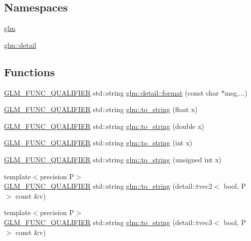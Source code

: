 \subsection*{Namespaces}
\begin{DoxyCompactItemize}
\item 
 \hyperlink{namespaceglm}{glm}
\item 
 \hyperlink{namespaceglm_1_1detail}{glm\+::detail}
\end{DoxyCompactItemize}
\subsection*{Functions}
\begin{DoxyCompactItemize}
\item 
\hyperlink{setup_8hpp_a33fdea6f91c5f834105f7415e2a64407}{G\+L\+M\+\_\+\+F\+U\+N\+C\+\_\+\+Q\+U\+A\+L\+I\+F\+I\+ER} std\+::string \hyperlink{namespaceglm_1_1detail_acd5305bbd1c5417b1eb770faf8229d14}{glm\+::detail\+::format} (const char $\ast$msg,...)
\item 
\hyperlink{setup_8hpp_a33fdea6f91c5f834105f7415e2a64407}{G\+L\+M\+\_\+\+F\+U\+N\+C\+\_\+\+Q\+U\+A\+L\+I\+F\+I\+ER} std\+::string \hyperlink{namespaceglm_a7ce206c00733fcd6f17f2923de5009ae}{glm\+::to\+\_\+string} (float x)
\item 
\hyperlink{setup_8hpp_a33fdea6f91c5f834105f7415e2a64407}{G\+L\+M\+\_\+\+F\+U\+N\+C\+\_\+\+Q\+U\+A\+L\+I\+F\+I\+ER} std\+::string \hyperlink{namespaceglm_adda934ba3c94a727a59b850fbc7431d3}{glm\+::to\+\_\+string} (double x)
\item 
\hyperlink{setup_8hpp_a33fdea6f91c5f834105f7415e2a64407}{G\+L\+M\+\_\+\+F\+U\+N\+C\+\_\+\+Q\+U\+A\+L\+I\+F\+I\+ER} std\+::string \hyperlink{namespaceglm_aaa0a03765f0abafa90fa4f605ce016b9}{glm\+::to\+\_\+string} (int x)
\item 
\hyperlink{setup_8hpp_a33fdea6f91c5f834105f7415e2a64407}{G\+L\+M\+\_\+\+F\+U\+N\+C\+\_\+\+Q\+U\+A\+L\+I\+F\+I\+ER} std\+::string \hyperlink{namespaceglm_aedf5aff2c68a8c282820904ba2396625}{glm\+::to\+\_\+string} (unsigned int x)
\item 
{\footnotesize template$<$precision P$>$ }\\\hyperlink{setup_8hpp_a33fdea6f91c5f834105f7415e2a64407}{G\+L\+M\+\_\+\+F\+U\+N\+C\+\_\+\+Q\+U\+A\+L\+I\+F\+I\+ER} std\+::string \hyperlink{namespaceglm_a68ac143fd7a22236f078e45cf8788cbe}{glm\+::to\+\_\+string} (detail\+::tvec2$<$ bool, P $>$ const \&v)
\item 
{\footnotesize template$<$precision P$>$ }\\\hyperlink{setup_8hpp_a33fdea6f91c5f834105f7415e2a64407}{G\+L\+M\+\_\+\+F\+U\+N\+C\+\_\+\+Q\+U\+A\+L\+I\+F\+I\+ER} std\+::string \hyperlink{namespaceglm_afb3ab72a854a2aae00b8fd819f4b6dd1}{glm\+::to\+\_\+string} (detail\+::tvec3$<$ bool, P $>$ const \&v)

\end{DoxyCompactItemize}
